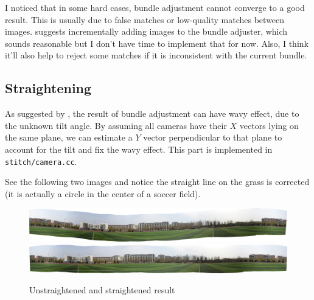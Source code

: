 I noticed that in some hard cases, bundle adjustment cannot converge to a good result.
This is usually due to false matches or low-quality matches between images.
\cite{panoramic-sift} suggests incrementally adding images to the bundle adjuster,
which sounds reasonable but I don't have time to implement that for now.
Also, I think it'll also help to reject some matches if it is inconsistent with
the current bundle.

\subsection{Straightening}
As suggested by \cite{panoramic-sift}, the result of bundle adjustment
can have wavy effect, due to the unknown tilt angle.
By assuming all cameras have their $X$ vectors lying on the same plane,
we can estimate a $Y$ vector perpendicular to that plane
to account for the tilt and fix the wavy effect. This part
is implemented in \verb|stitch/camera.cc|.

See the following two images and notice the straight line on the grass
is corrected (it is actually a circle in the center of a soccer field).
\begin{figure}[H]
  \centering
  \includegraphics[width=\textwidth]{res/wavy.jpg}
  \includegraphics[width=\textwidth]{res/unwavy.jpg}
  \caption{Unstraightened and straightened result\label{fig:general-straighten}}
\end{figure}

